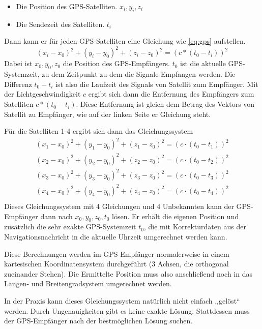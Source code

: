 \documentclass[12pt,a4paper]{scrartcl}
\begin{document}
\begin{itemize}
\item Die Position des GPS-Satelliten. $x_i,y_i,z_i$
\item Die Sendezeit des Satelliten. $t_i$
\end{itemize}

Dann kann er für jeden GPS-Satelliten eine Gleichung wie \eqref{eq:gps} aufstellen.
\begin{equation}
\label{eq:gps}
(x_i - x_0)^2 + (y_i - y_0)^2 + (z_i - z_0)^2 = (c*(t_0-t_i))^2
\end{equation}
Dabei ist $x_0,y_0,z_0$ die Position des GPS-Empfängers. $t_0$ ist die aktuelle GPS-Systemzeit, zu dem Zeitpunkt zu dem die Signale Empfangen werden. Die Differenz $t_0-t_i$ ist also die Laufzeit des Signals von Satellit zum Empfänger. Mit der Lichtgeschwindigkeit $c$ ergibt sich dann die Entfernung des Empfängers zum Satelliten $c*(t_0-t_i)$. Diese Entfernung ist gleich dem Betrag des Vektors von Satellit zu Empfänger, wie auf der linken Seite er Gleichung steht.

Für die Satelliten 1-4 ergibt sich dann das Gleichungssystem
\begin{align*}
(x_1 - x_0)^2 + (y_1 - y_0)^2 + (z_1 - z_0)^2 = (c\cdot(t_0-t_1))^2 \\
(x_2 - x_0)^2 + (y_2 - y_0)^2 + (z_2 - z_0)^2 = (c\cdot(t_0-t_2))^2 \\
(x_3 - x_0)^2 + (y_3 - y_0)^2 + (z_3 - z_0)^2 = (c\cdot(t_0-t_3))^2 \\
(x_4 - x_0)^2 + (y_4 - y_0)^2 + (z_4 - z_0)^2 = (c\cdot(t_0-t_4))^2 \\
\end{align*}
Dieses Gleichungssystem mit 4 Gleichungen und 4 Unbekannten kann der GPS-Empfänger dann nach $x_0,y_0,z_0,t_0$ lösen. Er erhält die eigenen Position und zusätzlich die sehr exakte GPS-Systemzeit $t_0$, die mit Korrekturdaten aus der Navigationsnachricht in die aktuelle Uhrzeit umgerechnet werden kann.

Diese Berechnungen werden im GPS-Empfänger normalerweise in einem kartesischen Koordinatensystem durchgeführt (3 Achsen, die orthogonal zueinander Stehen). Die Ermittelte Position muss also anschließend noch in das Längen- und Breitengradsystem umgerechnet werden.

In der Praxis kann dieses Gleichungssystem natürlich nicht einfach „gelöst“ werden. Durch Ungenauigkeiten gibt es keine exakte Lösung. Stattdessen muss der GPS-Empfänger nach der bestmöglichen Lösung suchen.
\end{document}
